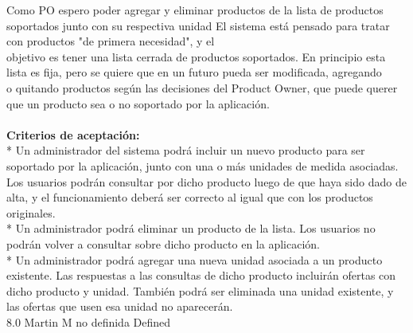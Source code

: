 	{Como PO espero poder agregar y eliminar productos de la lista de productos soportados junto con su respectiva unidad} %
	{El sistema está pensado para tratar con productos "de primera necesidad", y el\\
objetivo es tener una lista cerrada de productos soportados. En principio esta\\
lista es fija, pero se quiere que en un futuro pueda ser modificada, agregando\\
o quitando productos según las decisiones del Product Owner, que puede querer\\
que un producto sea o no soportado por la aplicación.\\
  \\
\textbf{Criterios de aceptación:}\\
* Un administrador del sistema podrá incluir un nuevo producto para ser soportado por la aplicación, junto con una o más unidades de medida asociadas. Los usuarios podrán consultar por dicho producto luego de que haya sido dado de alta, y el funcionamiento deberá ser correcto al igual que con los productos originales.  \\
* Un administrador podrá eliminar un producto de la lista. Los usuarios no podrán volver a consultar sobre dicho producto en la aplicación.  \\
* Un administrador podrá agregar una nueva unidad asociada a un producto existente. Las respuestas a las consultas de dicho producto incluirán ofertas con dicho producto y unidad. También podrá ser eliminada una unidad existente, y las ofertas que usen esa unidad no aparecerán.\\
} %
	{} %
	{8.0} %
	{Martin M} %
	{no definida} %
	{Defined} %


\vspace{20pt}

